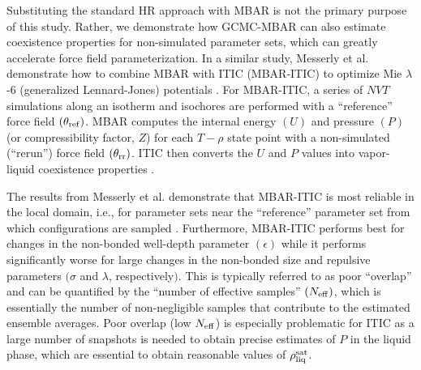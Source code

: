 \documentclass[journal=jced,manuscript=article]{achemso}
\begin{document}
Substituting the standard HR approach with MBAR is not the primary purpose of this study. Rather, we demonstrate how GCMC-MBAR can also estimate coexistence properties for non-simulated parameter sets, which can greatly accelerate force field parameterization. In a similar study, Messerly et al. demonstrate how to combine MBAR with ITIC (MBAR-ITIC) to optimize Mie $\lambda$-6 (generalized Lennard-Jones) potentials \cite{Postdoc_1,Postdoc_2}. For MBAR-ITIC, a series of $NVT$ simulations along an isotherm and isochores are performed with a ``reference'' force field $(\theta_{\rm ref})$. MBAR computes the internal energy $(U)$ and pressure $(P)$ (or compressibility factor, $Z$) for each $T-\rho$ state point with a non-simulated (``rerun'') force field $(\theta_{\rm rr})$. ITIC then converts the $U$ and $P$ values into vapor-liquid coexistence properties \cite{Mostafa_Diss,Mostafa2018}.



The results from Messerly et al. demonstrate that MBAR-ITIC is most reliable in the local domain, i.e., for parameter sets near the ``reference'' parameter set from which configurations are sampled \cite{Postdoc_1}. Furthermore, MBAR-ITIC performs best for changes in the non-bonded well-depth parameter $(\epsilon)$ while it performs significantly worse for large changes in the non-bonded size and repulsive parameters $(\sigma$ and $\lambda$, respectively$)$. This is typically referred to as poor ``overlap'' and can be quantified by the ``number of effective samples'' $(N_{\rm eff})$, which is essentially the number of non-negligible samples that contribute to the estimated ensemble averages. Poor overlap (low $N_{\rm eff}$) is especially problematic for ITIC as a large number of snapshots is needed to obtain precise estimates of $P$ in the liquid phase, which are essential to obtain reasonable values of $\rho_{\rm liq}^{\rm sat}$.

\end{document}
